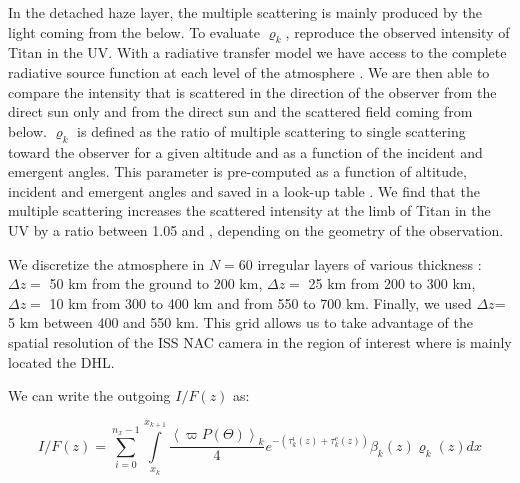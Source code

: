 In the detached haze layer, the multiple scattering is mainly produced by the light coming from the  below. To
evaluate $\varrho_k$, 
reproduce the observed intensity of Titan in the UV. With a radiative transfer model \citep[SHDOMPP, from ][]{Evans1998}
we have access to the complete radiative source function at each level of the atmosphere . We are then able to compare the
intensity that is scattered in the direction of the observer from the direct sun only and from the direct sun and the scattered
field coming from below. $\varrho_k$ is defined as the ratio of multiple scattering to single scattering toward the observer
for a given altitude and as a function of the incident and emergent angles. This parameter is pre-computed as a function of
altitude, incident and emergent angles and saved in a look-up table \citep[see.][for details]{West2018}.
We find that the multiple scattering increases the scattered intensity at the limb of Titan in the UV by a ratio between
1.05 and , depending on the geometry of the observation.

We discretize the atmosphere in $N = 60$ irregular layers of various thickness : $\Delta z =$ 50 km from the
ground to 200 km, $\Delta z =$ 25 km from 200 to 300 km, $\Delta z =$ 10 km from 300 to 400 km and from 550 to 700 km.
Finally, we used $\Delta z$= 5 km between 400 and 550 km. This grid allows us to take advantage of the spatial resolution
of the ISS NAC camera in the region of interest where is mainly located the DHL.

We can write the outgoing $I/F (z)$ as:

\begin{equation}
I/F (z) = \sum_{i=0}^{n_x-1} \int\limits_{x_k}^{x_{k+1}}
\frac{\left< \varpi P(\Theta) \right>_k}{4}
e^{-\left( \tau^i_k\left(z\right) + \tau^e_k\left(z\right) \right)}
\beta_k\left(z\right) \varrho_k\left(z\right) d{x}
\label{eq:west2017_sup_limb}
\end{equation}

